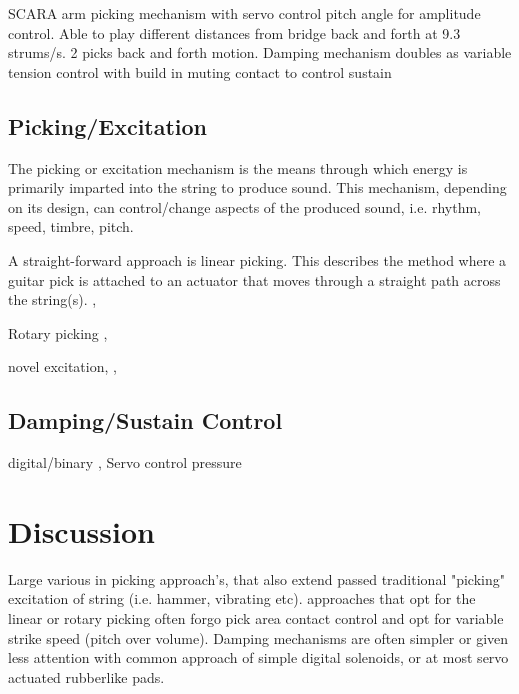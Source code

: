 \documentclass[11pt]{article}
\begin{document}
\cite{strumbot} SCARA arm picking mechanism with servo control pitch angle for amplitude control. Able to play different distances from bridge back and forth at 9.3 strums/s. 2 picks back and forth motion. Damping mechanism doubles as variable tension control with build in muting contact to control sustain

\subsection{Picking/Excitation}
The picking or excitation mechanism is the means through which energy is primarily imparted into the string to produce sound. This mechanism, depending on its design, can control/change aspects of the produced sound, i.e. rhythm, speed, timbre, pitch.

A straight-forward approach is linear picking. This describes the method where a guitar pick is attached to an actuator that moves through a straight path across the string(s). \cite{actuated}, \cite{Kapur}

Rotary picking \cite{singer}, \cite{strumbot}

novel excitation, \cite{hammer}, \cite{vibe_harp}

\subsection{Damping/Sustain Control}

digital/binary , Servo control pressure


\section{Discussion}
Large various in picking approach's, that also extend passed traditional "picking" excitation of string (i.e. hammer, vibrating etc). approaches that opt for the linear or rotary picking often forgo pick area contact control and opt for variable strike speed (pitch over volume). Damping mechanisms are often simpler or given less attention with common  approach of simple digital solenoids, or at most servo actuated rubberlike pads.  


\newpage


\end{document}
